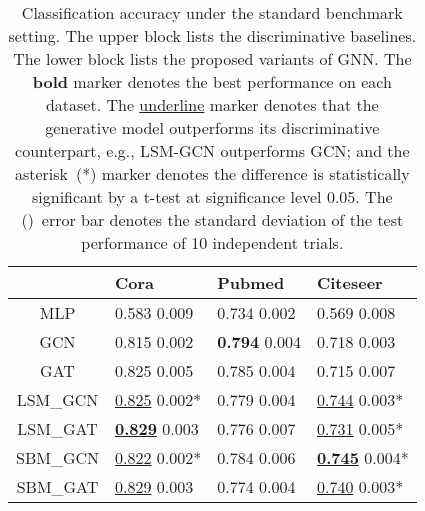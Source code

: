\documentclass{article}
\begin{document}
\begin{table}[tb]
\centering
\caption{Classification accuracy under the standard benchmark setting. The upper block lists the discriminative baselines. The lower block lists the proposed variants of GNN. The \textbf{bold} marker denotes the best performance on each dataset. The \underline{underline} marker denotes that the generative model outperforms its discriminative counterpart, e.g., LSM-GCN outperforms GCN; and the asterisk~(*) marker denotes the difference is statistically significant by a t-test at significance level 0.05. The ()~error bar denotes the standard deviation of the test performance of 10 independent trials.}
\label{tbl:standard}
\begin{tabular}{clll}
\toprule
{} &                                            Cora &                              Pubmed &                                        Citeseer \\
\midrule
MLP     &                       0.583  \small{0.009} &           0.734  \small{0.002} &                       0.569  \small{0.008} \\
GCN     &                       0.815  \small{0.002} &  \textbf{0.794}  \small{0.004} &                       0.718  \small{0.003} \\
GAT     &                       0.825  \small{0.005} &           0.785  \small{0.004} &                       0.715  \small{0.007} \\
\hline
LSM\_GCN &           \underline{0.825}  \small{0.002}* &           0.779  \small{0.004} &           \underline{0.744}  \small{0.003}* \\
LSM\_GAT &  \underline{\textbf{0.829}}  \small{0.003} &           0.776  \small{0.007} &           \underline{0.731}  \small{0.005}* \\
SBM\_GCN &           \underline{0.822}  \small{0.002}* &           0.784  \small{0.006} &  \underline{\textbf{0.745}}  \small{0.004}* \\
SBM\_GAT &           \underline{0.829}  \small{0.003} &           0.774  \small{0.004} &           \underline{0.740}  \small{0.003}* \\
\bottomrule
\end{tabular}

\end{table}
\end{document}

